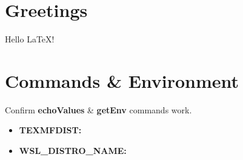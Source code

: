 \documentclass{article}%
\newcommand{\echoValues}[2]{%
    \textbf{#1:}%
    \newline%
    [#2]%
  }%
\begin{document}
%

\section{Greetings}
Hello \LaTeX!

\section{Commands \& Environment}\label{sec:side-effects}%
Confirm \textbf{echoValues} \& \textbf{getEnv} commands work.

\begin{itemize}%
  \item \echoValues{TEXMFDIST}{\texDist}%
  \item \echoValues{WSL\_DISTRO\_NAME}{\wsl}%
\end{itemize}
\end{document}
